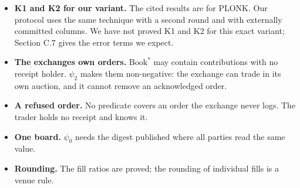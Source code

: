 \begin{itemize}
\item
  \textbf{K1 and K2 for our variant.} The cited results are for PLONK. Our protocol uses the same technique with a second round and with externally committed columns. We have not proved K1 and K2 for this exact variant; Section C.7 gives the error terms we expect.
\item
  \textbf{The exchange\textquotesingle s own orders.} \(\text{Book}^*\) may contain contributions with no receipt holder. \(\psi_2\) makes them non-negative: the exchange can trade in its own auction, and it cannot remove an acknowledged order.
\item
  \textbf{A refused order.} No predicate covers an order the exchange never logs. The trader holds no receipt and knows it.
\item
  \textbf{One board.} \(\psi_0\) needs the digest published where all parties read the same value.
\item
  \textbf{Rounding.} The fill ratios are proved; the rounding of individual fills is a venue rule.
\end{itemize}
